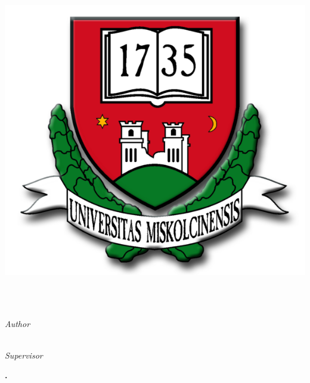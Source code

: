 \documentclass[13pt, a4paper, oneside]{Thesis} %
\begin{document}

\begin{titlepage}
\begin{flushleft}
\Large{
\univname\\
\instname\\
\deptname
}
\end{flushleft}
\begin{center}


\vspace{1cm}

\includegraphics[width=0.4\linewidth]{./figures/miskolc_logo.png}

\vspace{1cm}

{\huge \bfseries \ttitle}\\[0.4cm] %

\textsc{\Large \degreename}\\[0.5cm] %

 \vspace{4cm}

\textit{Author}\\
\authornames\\
\textsc{\authorId}

\vspace{2cm}

\textit{Supervisor}\\
\supname

\vspace{2cm}

\textbf{\the\year.}

\vfill
\end{center}

\end{titlepage}

\end{document}
